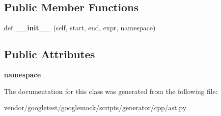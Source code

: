\subsection*{Public Member Functions}
\begin{DoxyCompactItemize}
\item 
def {\bfseries \+\_\+\+\_\+init\+\_\+\+\_\+} (self, start, end, expr, namespace)\hypertarget{classcpp_1_1ast_1_1Friend_a9fe245d0f14eaab85435e942a56de7e6}{}\label{classcpp_1_1ast_1_1Friend_a9fe245d0f14eaab85435e942a56de7e6}

\end{DoxyCompactItemize}
\subsection*{Public Attributes}
\begin{DoxyCompactItemize}
\item 
{\bfseries namespace}\hypertarget{classcpp_1_1ast_1_1Friend_a076c68dddae9bd1e24d224d005538014}{}\label{classcpp_1_1ast_1_1Friend_a076c68dddae9bd1e24d224d005538014}

\end{DoxyCompactItemize}


The documentation for this class was generated from the following file\+:\begin{DoxyCompactItemize}
\item 
vendor/googletest/googlemock/scripts/generator/cpp/ast.\+py\end{DoxyCompactItemize}
